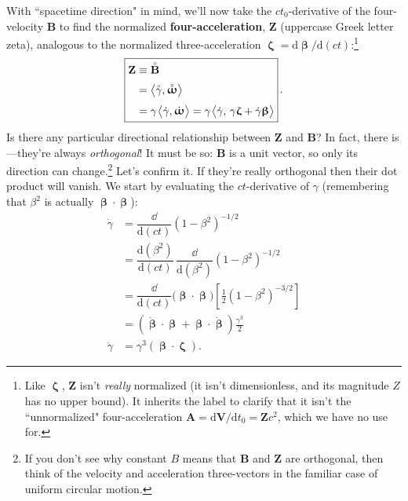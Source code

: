 \documentclass[12pt]{article}
\renewcommand{\mathring}[1]{\accentset{\circ}{#1}}
\renewcommand{\vv}[1]{\mathbf{#1}}
\newcommand{\dd}[1]{\mathrm{d}#1}
\newcommand{\vvbeta}{\bm{\upbeta}}
\newcommand{\vvomega}{\bm{\upomega}}
\newcommand{\vvzeta}{\bm{\upzeta}}
\begin{document}
With ``spacetime direction" in mind, we'll now take the $c t_0$-derivative of the four-velocity $\vv B$ to find the normalized \textbf{four-acceleration}, $\vv Z$ (uppercase Greek letter zeta), analogous to the normalized three-acceleration ${\vvzeta=\dd \vvbeta / \dd (ct)}$:\footnote{Like $\vvzeta$, $\vv Z$ isn't \emph{really} normalized (it isn't dimensionless, and its magnitude $Z$ has no upper bound). It inherits the label to clarify that it isn't the ``unnormalized" four-acceleration $\vv A = \dd \vv V / \dd t_0 = \vv Z c^2$, which we have no use for.}
\begin{equation}\label{eq:34}
\boxed{
\begin{aligned}
\vv Z &\equiv \mathring{\vv B} \\[2pt]
&= \big \langle \mathring{\gamma}, \mathring{\vvomega} \big \rangle \\[3pt]
&= \gamma \mkern1.5mu \big \langle \dot{\gamma}, \dot{\vvomega} \big \rangle = \gamma \mkern1.5mu \big \langle \dot{\gamma}, \, \gamma \vvzeta + \dot{\gamma} \vvbeta \big \rangle
\end{aligned}
} \, .
\end{equation}
Is there any particular directional relationship between $\vv Z$ and $\vv B$? In fact, there is---they're always \emph{orthogonal}! It must be so: $\vv B$ is a unit vector, so only its direction can change.\footnote{If you don't see why constant $B$ means that $\vv B$ and $\vv Z$ are orthogonal, then think of the velocity and acceleration three-vectors in the familiar case of uniform circular motion.} Let's confirm it. If they're really orthogonal then their dot product will vanish. We start by evaluating the $ct$-derivative of $\gamma$ (remembering that $\beta^2$ is actually $\vvbeta \cdot \vvbeta$):
\begin{equation}\label{eq:gd}
\begin{split}
\dot{\gamma} &= \dfrac{\dd}{\dd (ct)} \left(1-\beta^2 \right)^{-1/2} \\[3pt]
&= \dfrac{\dd (\beta^2)}{\dd (ct)} \, \dfrac{\dd}{\dd ( \beta^2 )} \left( 1 - \beta^2 \right)^{-1/2} \\[3pt]
&= \dfrac{\dd}{\dd (ct)} \bigl( \vvbeta \cdot \vvbeta \bigr) \left[ \frac{1}{2} \left( 1 - \beta ^2 \right)^{-3/2} \right] \\[2pt]
&= \left( \dot{\vvbeta} \cdot \vvbeta + \vvbeta \cdot \dot{\vvbeta} \right) \frac{\gamma^3}{2} \\[3pt]
\dot{\gamma} &= \gamma^3 (\vvbeta \cdot \vvzeta).
\end{split}
\end{equation}
\end{document}
